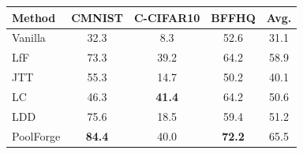 \begin{tabular}{lcccc}
\toprule
Method & CMNIST & C-CIFAR10 & BFFHQ & Avg. \\
\midrule
Vanilla & 32.3 & 8.3 & 52.6 & 31.1 \\
LfF & 73.3 & 39.2 & 64.2 & 58.9 \\
JTT & 55.3 & 14.7 & 50.2 & 40.1 \\
LC & 46.3 & \textbf{41.4} & 64.2 & 50.6 \\
LDD & 75.6 & 18.5 & 59.4 & 51.2 \\
\rowcolor{ours}PoolForge & \textbf{84.4} & 40.0 & \textbf{72.2} & 65.5 \\
\bottomrule
\end{tabular}
